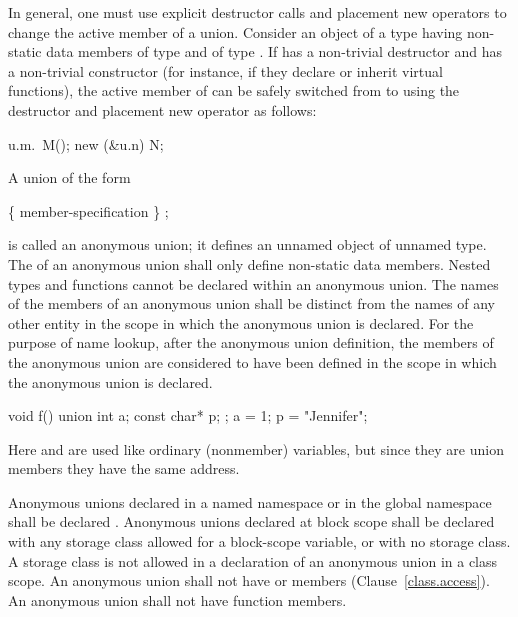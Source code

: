 \pnum
\enternote In general, one must use explicit destructor calls and placement
new operators to change the active member of a union. \exitnote
\enterexample
Consider an object  of a  type  having non-static data members
 of type  and  of type . If  has a non-trivial
destructor and  has a non-trivial constructor (for instance, if they declare or inherit
virtual functions), the active member of  can be safely switched from  to
 using the destructor and placement new operator as follows:

\begin{codeblock}
u.m.~M();
new (&u.n) N;
\end{codeblock}
\exitexample

\pnum
{}%
A union of the form

\begin{ncbnftab}
 \{ member-specification \} ;
\end{ncbnftab}

is called an anonymous union; it defines an unnamed object of unnamed
type. The  of an anonymous union shall
only define non-static data members.
\enternote
Nested types and functions cannot be declared within an anonymous union.
\exitnote
The names of the members of an anonymous union shall be distinct from
the names of any other entity in the scope in which the anonymous union
is declared. For the purpose of name lookup, after the anonymous union
definition, the members of the anonymous union are considered to have
been defined in the scope in which the anonymous union is declared.
%
\enterexample

\begin{codeblock}
void f() {
  union { int a; const char* p; };
  a = 1;
  p = "Jennifer";
}
\end{codeblock}

Here  and  are used like ordinary (nonmember)
variables, but since they are union members they have the same address.
\exitexample

\pnum
{}%
%
Anonymous unions declared in a named namespace or in the global
namespace shall be declared . Anonymous unions declared at
block scope shall be declared with any storage class allowed for a
block-scope variable, or with no storage class. A storage class is not
allowed in a declaration of an anonymous union in a class scope.
%
%
An anonymous union shall not have  or 
members (Clause~\ref{class.access}). An anonymous union shall not have
function members.

